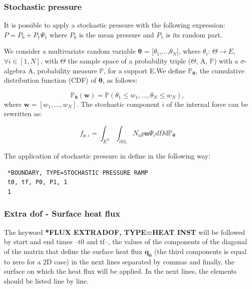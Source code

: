 \documentclass[oneside,11pt,times]{book}
\begin{document}
\subsubsection{Stochastic pressure}

It is possible to apply a stochastic pressure with the following expression: $P = P_{0} + P_{1}\Psi_{1}$ where $P_{0}$ is the mean pressure and $P_{1}$ is its random part. 

We consider a multivariate random variable  $\boldsymbol{\theta}$ = [$\theta_{1}$,...,$\theta_{N}$], where $\theta_{i}$: $\Theta \rightarrow{E}$, $\forall i \in [1,N]$, with $\Theta$ the sample space of a probability triple  ($\Theta$, A, $\mathbb{P}$) with a $\sigma$-algebra A, probability measure $\mathbb{P}$, for a support E.We define $\mathbb{P_{\boldsymbol{\theta}}}$, the cumulative distribution function (CDF) of $\boldsymbol{\theta}$, as follows:

 \begin{equation} \label{CumulativeDistributionFunction}
  \mathbb{P_{\bm{\theta}}}(\bm{w}) =  \mathbb{P}(\theta_{1} \leq w_{1},...,\theta_{N} \leq w_{N}),
\end{equation}
  where $\boldsymbol{w} = [w_{1},...,w_{N}]$. The stochastic component $i$ of the internal force can be rewritten as:

 \begin{equation}
f_{p,\iota}= \int_{E^{N}}\int_{\partial\Omega_c}N_ap\mathbf{n}\Psi_{\iota}d\Omega\text{d}\mathbb{P_{\bm{\theta}}}
\end{equation}  

The application of stochastic pressure in define in the following way:
\begin{lstlisting}
 *BOUNDARY, TYPE=STOCHASTIC PRESSURE RAMP
 t0, tf, P0, P1, 1
 1
 \end{lstlisting}

 
\subsubsection{Extra dof - Surface heat flux}

The keyword \textbf{*FLUX EXTRADOF, TYPE=HEAT INST} will be followed by start and end times --t0 and tf--, the values of the components of the diagonal of the matrix that define the surface heat flux $\bm{q_0}$ (the third components is equal to zero for a 2D case) in the next lines separated by commas and finally, the surface on which the heat flux will be applied. In the next lines, the elements should be listed line by line.
\end{document}
